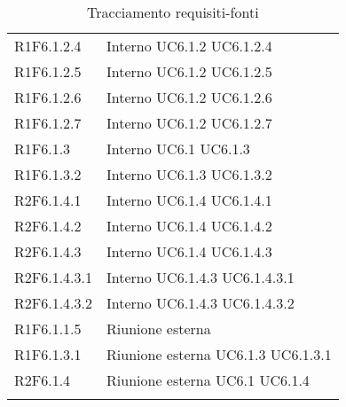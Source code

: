 \begin{longtable}{p{2.5cm}!{\VRule[1pt]}p{2.5cm}}
R1F6.1.2.4 & Interno \newline UC6.1.2
 \newline UC6.1.2.4
 \\
R1F6.1.2.5 & Interno \newline UC6.1.2
 \newline UC6.1.2.5
 \\
R1F6.1.2.6 & Interno \newline UC6.1.2
 \newline UC6.1.2.6
 \\
R1F6.1.2.7 & Interno \newline UC6.1.2
 \newline UC6.1.2.7
 \\
R1F6.1.3 & Interno \newline UC6.1
 \newline UC6.1.3
 \\
R1F6.1.3.2 & Interno \newline UC6.1.3
 \newline UC6.1.3.2
 \\
R2F6.1.4.1 & Interno \newline UC6.1.4
 \newline UC6.1.4.1
 \\
R2F6.1.4.2 & Interno \newline UC6.1.4
 \newline UC6.1.4.2
 \\
R2F6.1.4.3 & Interno \newline UC6.1.4
 \newline UC6.1.4.3
 \\
R2F6.1.4.3.1 & Interno \newline UC6.1.4.3
 \newline UC6.1.4.3.1
 \\
R2F6.1.4.3.2 & Interno \newline UC6.1.4.3
 \newline UC6.1.4.3.2
 \\
R1F6.1.1.5 & Riunione esterna \\
R1F6.1.3.1 & Riunione esterna \newline UC6.1.3
 \newline UC6.1.3.1
 \\
R2F6.1.4 & Riunione esterna \newline UC6.1
 \newline UC6.1.4
 \\
\caption{Tracciamento requisiti-fonti}
\end{longtable}